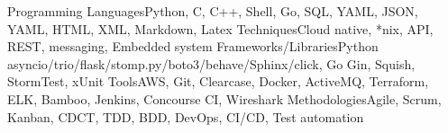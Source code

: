 \begin{cvskills}
  \cvskill
    {Programming Languages}{Python, C, C++, Shell, Go, SQL, YAML, JSON, YAML, HTML, XML, Markdown, Latex}
  \cvskill
    {Techniques}{Cloud native, *nix, API, REST, messaging, Embedded system}
  \cvskill
    {Frameworks/Libraries}{Python asyncio/trio/flask/stomp.py/boto3/behave/Sphinx/click, Go Gin, Squish, StormTest, xUnit}
  \cvskill
    {Tools}{AWS, Git, Clearcase, Docker, ActiveMQ, Terraform, ELK, Bamboo, Jenkins, Concourse CI, Wireshark}
  \cvskill
    {Methodologies}{Agile, Scrum, Kanban, CDCT, TDD, BDD, DevOps, CI/CD, Test automation}
\end{cvskills}
